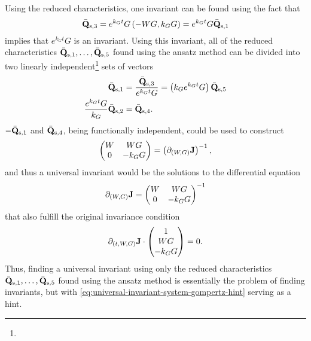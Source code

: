 Using the reduced characteristics, one invariant can be found using the fact that
\begin{equation}
  \bar{\vb{Q}}_{\text{s},3} = e^{k_{G} t} G \left(-W G, k_G G\right) = e^{k_{G} t} G \bar{\vb{Q}}_{\text{s},1}
\end{equation}
implies that \(e^{k_{G} t} G\) is an invariant.
Using this invariant, all of the reduced characteristics \(\bar{\vb{Q}}_{\text{s},1}, \dots, \bar{\vb{Q}}_{\text{s},5}\) found using the ansatz method can be divided into two linearly independent\footnote{} sets of vectors %
\begin{align}
  \bar{\vb{Q}}_{\text{s},1} &= \frac{\bar{\vb{Q}}_{\text{s},3}}{e^{k_{G} t} G} = \left(k_G e^{k_{G} t} G\right) \bar{\vb{Q}}_{\text{s},5} \\
  \frac{e^{k_{G} t} G}{k_G} \bar{\vb{Q}}_{\text{s},2} &= \bar{\vb{Q}}_{\text{s},4}.
\end{align}
\(-\bar{\vb{Q}}_{\text{s},1}\) and \(\bar{\vb{Q}}_{\text{s},4}\), being functionally independent, could be used to construct
\begin{equation}
  \begin{pmatrix}
    W & W G \\
    0 & -k_G G
  \end{pmatrix}
  = \left(\partial_{(W, G)} \vb{J}\right)^{-1},
\end{equation}
and thus a universal invariant would be the solutions to the differential equation
\begin{equation} \label{eq:universal-invariant-system-gompertz-hint}
  \partial_{(W, G)} \vb{J} =
  \begin{pmatrix}
    W & W G \\
    0 & -k_G G
  \end{pmatrix}^{-1}
\end{equation}
that also fulfill the original invariance condition
\begin{equation}
  \partial_{(t, W, G)} \vb{J} \cdot
  \begin{pmatrix}
    1 \\
    W G \\
    -k_G G
  \end{pmatrix}
  = 0.
\end{equation}
Thus, finding a universal invariant using only the reduced characteristics \(\bar{\vb{Q}}_{\text{s},1}, \dots, \bar{\vb{Q}}_{\text{s},5}\) found using the ansatz method is essentially the problem of finding invariants, but with \cref{eq:universal-invariant-system-gompertz-hint} serving as a hint.
